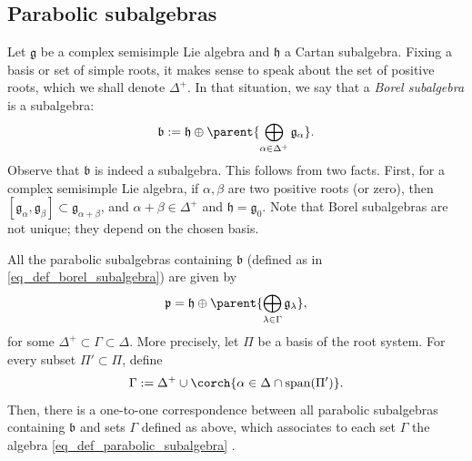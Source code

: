 \subsection{Parabolic subalgebras} \label{section_parabolic_subalgebras}
Let \(\mathfrak{g}\) be a complex semisimple Lie algebra and \(\mathfrak{h}\) a Cartan subalgebra. Fixing a basis or set of simple roots, it makes sense to speak about the set of positive roots, which we shall denote \(\Delta^+\). In that situation, we say that a \textit{Borel subalgebra} is a subalgebra:
\begin{equation} \label{eq_def_borel_subalgebra}
\mathfrak{b}:=\mathfrak{h} \oplus \parent{\bigoplus _{\alpha \in \Delta^+}\mathfrak{g}_\alpha}.
\end{equation}
Observe that \(\mathfrak{b}\) is indeed a subalgebra. This follows from two facts. First, for a complex semisimple Lie algebra, if \(\alpha, \beta\) are two positive roots (or zero), then \([\mathfrak{g}_\alpha, \mathfrak{g}_\beta] \subset \mathfrak{g}_{\alpha+\beta}\), and \(\alpha+ \beta \in \Delta^+\) \parencite[Lemma 6.3.5]{hilgert2011structure} and \(\mathfrak{h}=\mathfrak{g}_0\). Note that Borel subalgebras are not unique; they depend on the chosen basis.

All the parabolic subalgebras containing \(\mathfrak{b}\) (defined as in \eqref{eq_def_borel_subalgebra}) are given by
\begin{equation} \label{eq_def_parabolic_subalgebra}
\mathfrak{p}=\mathfrak{h} \oplus \parent{\bigoplus_{\lambda \in \Gamma}\mathfrak{g}_\lambda},
\end{equation}
for some \(\Delta^+\subset \Gamma \subset \Delta\). More precisely, let \(\Pi\) be a basis of the root system. For every subset \(\Pi'\subset \Pi\), define 
\begin{equation} \label{def_set_gamma}
\Gamma:=\Delta^+ \cup \corch{\alpha \in \Delta\cap \mathrm{span}(\Pi')}.
\end{equation}
Then, there is a one-to-one correspondence between all parabolic subalgebras containing \(\mathfrak{b}\) and sets \(\Gamma\) defined as above, which associates to each set \(\Gamma\) the algebra \eqref{eq_def_parabolic_subalgebra} \parencite[Prop. 5.90]{knapp2013lie}. 

